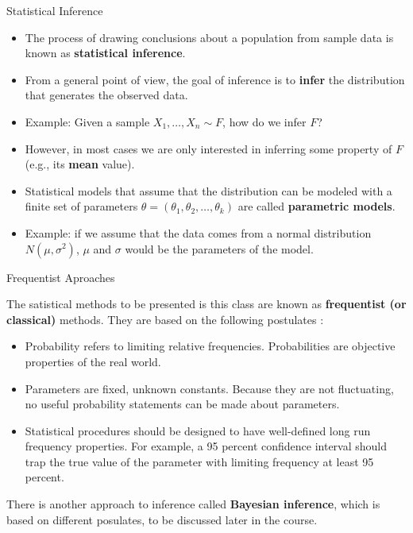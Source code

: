 \documentclass[handout]{beamer}
\begin{document}
\begin{frame}{Statistical Inference }
\scriptsize{
\begin{itemize}
 \item The process of drawing conclusions about a population from sample data is known as \textbf{statistical inference}.
\item From a general point of view, the goal of inference is to \textbf{infer} the distribution that generates the observed data.
\item Example: Given a sample $X_1, \dots, X_n \sim F$, how do we infer $F$? 
\item However, in most cases we are only interested in inferring some property of $F$ (e.g., its \textbf{mean} value).
\item Statistical models that assume that the distribution can be modeled with a finite set of parameters $\theta= (\theta_{1},\theta_{2},\dots,\theta_{k})$ are called \textbf{parametric models}. 
\item Example: if we assume that the data comes from a normal distribution $N(\mu,\sigma^2)$, $\mu$ and $\sigma$ would be the parameters of the model. 
\end{itemize}

} 
\end{frame}


\begin{frame}{Frequentist Aproaches}
\scriptsize{
The satistical methods to be presented is this class are known as \textbf{frequentist (or classical)} methods. They are based on the following postulates  \cite{wasserman2013all}:
\begin{itemize}
\item Probability refers to limiting relative frequencies. Probabilities are objective properties of the real world.
\item Parameters are fixed, unknown constants. Because they are not fluctuating, no useful probability statements can be made about parameters.
\item Statistical procedures should be designed to have well-defined long run frequency properties. For example, a 95 percent confidence interval should trap the true value of the parameter with limiting frequency at least 95 percent.
\end{itemize}
There is another approach to inference called \textbf{Bayesian inference}, which is based on different posulates, to be discussed later in the course.

} 
\end{frame}
\end{document}
